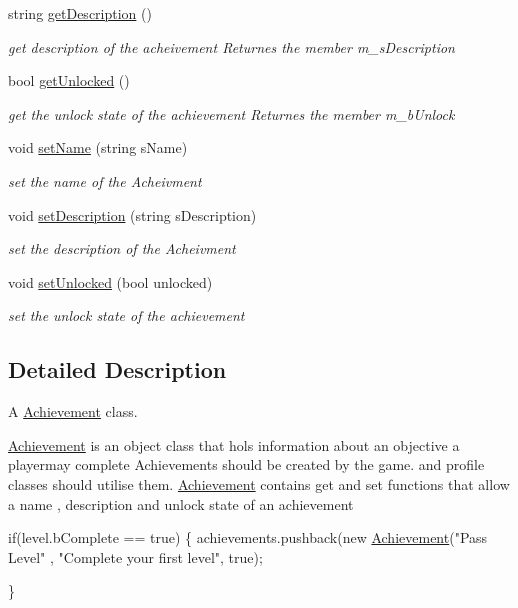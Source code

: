 \begin{DoxyCompactItemize}
\hypertarget{class_achievement_a68f758c3db2d4873ad5452fcea1a84b3}{}\label{class_achievement_a68f758c3db2d4873ad5452fcea1a84b3} 
string \hyperlink{class_achievement_a68f758c3db2d4873ad5452fcea1a84b3}{get\+Description} ()
\begin{DoxyCompactList}\small\item\em get description of the acheivement Returnes the member m\+\_\+s\+Description \end{DoxyCompactList}\item 
\hypertarget{class_achievement_a1f0bb77d394b03c28b636688d7cbbf2b}{}\label{class_achievement_a1f0bb77d394b03c28b636688d7cbbf2b} 
bool \hyperlink{class_achievement_a1f0bb77d394b03c28b636688d7cbbf2b}{get\+Unlocked} ()
\begin{DoxyCompactList}\small\item\em get the unlock state of the achievement Returnes the member m\+\_\+b\+Unlock \end{DoxyCompactList}\item 
void \hyperlink{class_achievement_a9e0c9c6c154411d3529bca657c579beb}{set\+Name} (string s\+Name)
\begin{DoxyCompactList}\small\item\em set the name of the Acheivment \end{DoxyCompactList}\item 
void \hyperlink{class_achievement_a1e43852ad31739236d393f856e1f8f12}{set\+Description} (string s\+Description)
\begin{DoxyCompactList}\small\item\em set the description of the Acheivment \end{DoxyCompactList}\item 
void \hyperlink{class_achievement_a59aa51eab50fed4fb72eee2ff733e3ac}{set\+Unlocked} (bool unlocked)
\begin{DoxyCompactList}\small\item\em set the unlock state of the achievement \end{DoxyCompactList}\end{DoxyCompactItemize}


\subsection{Detailed Description}
A \hyperlink{class_achievement}{Achievement} class.

\hyperlink{class_achievement}{Achievement} is an object class that hols information about an objective a playermay complete Achievements should be created by the game. and profile classes should utilise them. \hyperlink{class_achievement}{Achievement} contains get and set functions that allow a name , description and unlock state of an achievement 
\begin{DoxyCode}
\textcolor{keywordflow}{if}(level.bComplete == \textcolor{keyword}{true})
\{
     achievements.pushback(\textcolor{keyword}{new} \hyperlink{class_achievement_acea9a90b8128628e1bddc45a83afaa99}{Achievement}(\textcolor{stringliteral}{"Pass Level"} , \textcolor{stringliteral}{"Complete your first level"}, \textcolor{keyword}{true});

\}
\end{DoxyCode}
 

